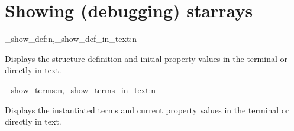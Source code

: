 \documentclass[10pt]{article}
\begin{document}
\section{Showing (debugging) starrays }\label{pack:show}

\begin{codedescribe}{\starray_show_def:n,\starray_show_def_in_text:n}
\begin{codesyntax}%
\end{codesyntax}
Displays the  structure definition and initial property values in the terminal or directly in text.
\end{codedescribe}


\begin{codedescribe}{\starray_show_terms:n,\starray_show_terms_in_text:n}
\begin{codesyntax}%
\end{codesyntax}
Displays the  instantiated terms and current  property values in the terminal or directly in text.
\end{codedescribe}
\end{document}
